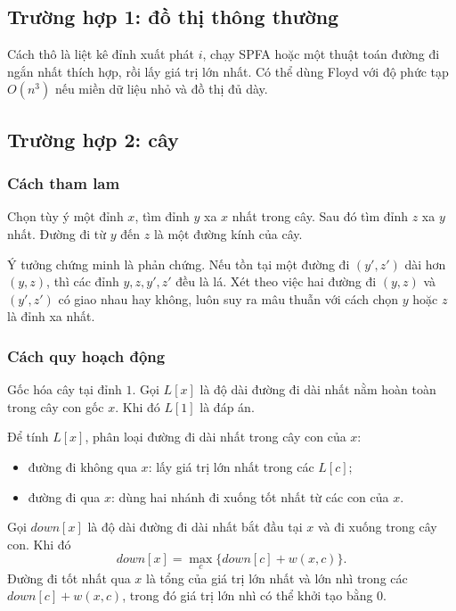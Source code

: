 \documentclass[11pt]{article}
\begin{document}
\subsection{Trường hợp 1: đồ thị thông thường}

Cách thô là liệt kê đỉnh xuất phát \(i\), chạy SPFA hoặc một thuật toán đường
đi ngắn nhất thích hợp, rồi lấy giá trị lớn nhất. Có thể dùng Floyd với độ
phức tạp \(O(n^3)\) nếu miền dữ liệu nhỏ và đồ thị đủ dày.

\subsection{Trường hợp 2: cây}

\subsubsection{Cách tham lam}

Chọn tùy ý một đỉnh \(x\), tìm đỉnh \(y\) xa \(x\) nhất trong cây. Sau đó tìm
đỉnh \(z\) xa \(y\) nhất. Đường đi từ \(y\) đến \(z\) là một đường kính của cây.

Ý tưởng chứng minh là phản chứng. Nếu tồn tại một đường đi \((y',z')\) dài hơn
\((y,z)\), thì các đỉnh \(y,z,y',z'\) đều là lá. Xét theo việc hai đường đi
\((y,z)\) và \((y',z')\) có giao nhau hay không, luôn suy ra mâu thuẫn với cách
chọn \(y\) hoặc \(z\) là đỉnh xa nhất.

\subsubsection{Cách quy hoạch động}

Gốc hóa cây tại đỉnh \(1\). Gọi \(L[x]\) là độ dài đường đi dài nhất nằm hoàn
toàn trong cây con gốc \(x\). Khi đó \(L[1]\) là đáp án.

Để tính \(L[x]\), phân loại đường đi dài nhất trong cây con của \(x\):
\begin{itemize}
  \item đường đi không qua \(x\): lấy giá trị lớn nhất trong các \(L[c]\);
  \item đường đi qua \(x\): dùng hai nhánh đi xuống tốt nhất từ các con của
  \(x\).
\end{itemize}

Gọi \(down[x]\) là độ dài đường đi dài nhất bắt đầu tại \(x\) và đi xuống trong
cây con. Khi đó
\[
  down[x] = \max_c \{ down[c] + w(x,c) \}.
\]
Đường đi tốt nhất qua \(x\) là tổng của giá trị lớn nhất và lớn nhì trong các
\(down[c] + w(x,c)\), trong đó giá trị lớn nhì có thể khởi tạo bằng \(0\).
\end{document}
